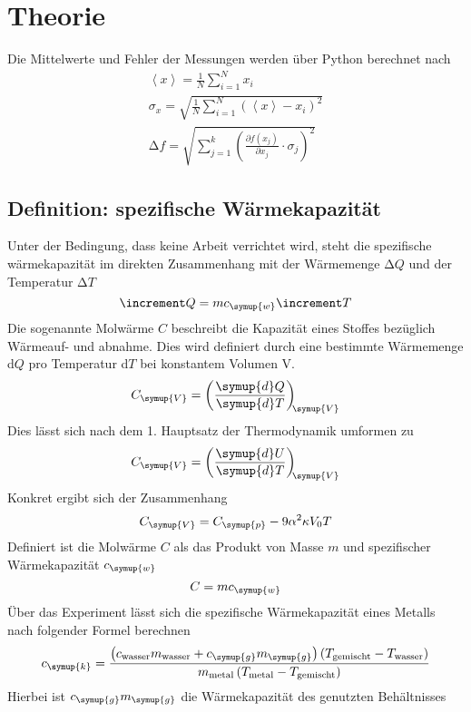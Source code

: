 \section{Theorie}
\label{sec:Theorie}
Die Mittelwerte und Fehler der Messungen werden über Python berechnet nach
\begin{gather}
  \left<x\right> = \frac{1}{N}\sum_{i=1}^N x_i
  \label{eqn:mittel}\\
  \sigma_x = \sqrt{\frac{1}{N}\sum_{i=1}^N \left(\left<x\right>-x_i\right)^2}
  \label{eqn:err}\\
  \increment f = \sqrt{\sum_{j=1}^k\left(\frac{\partial f\left(x_j\right)}{\partial x_j}\cdot\sigma_j\right)^{\!\!2}}
  \label{eqn:gauß}
\end{gather}
\subsection{Definition: spezifische Wärmekapazität}
Unter der Bedingung, dass keine Arbeit verrichtet wird, steht die spezifische
wärmekapazität im direkten Zusammenhang mit der Wärmemenge $\increment Q$ und
der Temperatur $\increment T$
\begin{equation}
  \increment Q = mc_\symup{w}\increment T
\end{equation}
Die sogenannte Molwärme $C$ beschreibt die Kapazität eines Stoffes bezüglich
Wärmeauf- und abnahme. Dies wird definiert durch eine bestimmte Wärmemenge
d$Q$ pro Temperatur d$T$ bei konstantem Volumen V.
\begin{equation}
  C_\symup{V} = \left(\frac{\symup{d}Q}{\symup{d}T}\right)_{\!\!\symup{V}}
\end{equation}
Dies lässt sich nach dem 1. Hauptsatz der Thermodynamik umformen zu
\begin{equation}
  C_\symup{V} = \left(\frac{\symup{d}U}{\symup{d}T}\right)_{\!\!\symup{V}}
  \label{eqn:CVdif}
\end{equation}
Konkret ergibt sich der Zusammenhang
\begin{equation}
    C_\symup{V}=C_\symup{p}-9\alpha^2\kappa V_0T
    \label{eqn:CVumf}
\end{equation}
Definiert ist die Molwärme $C$ als das Produkt von Masse $m$ und spezifischer
Wärmekapazität $c_\symup{w}$
\begin{equation}
  C = mc_\symup{w}
\end{equation}
Über das Experiment lässt sich die spezifische Wärmekapazität eines Metalls
nach folgender Formel berechnen
\begin{equation}
  c_\symup{k} = \frac{\left(c_\text{wasser}m_\text{wasser}+c_\symup{g}m_\symup{g}\right)
\left(T_\text{gemischt}-T_\text{wasser}\right)}{m_\text{metal}\left(T_\text{metal}-T_\text{gemischt}\right)}
\label{eqn:ckauswertung}
\end{equation}
Hierbei ist $c_\symup{g}m_\symup{g}$ die Wärmekapazität des genutzten
Behältnisses
